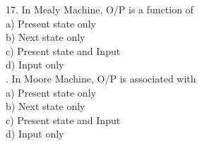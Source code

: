 \documentclass[a4,9pt]{beamer}
\begin{document}
\begin{frame}
17. In Mealy Machine, O/P is a function of \\
\hspace*{0.5cm} a) Present state only\\
\hspace*{0.5cm} b) Next state only\\
\hspace*{0.5cm} c) Present state and Input\\
\hspace*{0.5cm} d) Input only\\

\vspace*{0.2cm}
. In Moore Machine, O/P is associated with \\
\hspace*{0.5cm} a) Present state only \\
\hspace*{0.5cm} b) Next state only \\
\hspace*{0.5cm} c) Present state and Input \\
\hspace*{0.5cm} d) Input only \\

\vspace*{0.2cm}
\end{frame}
\end{document}
